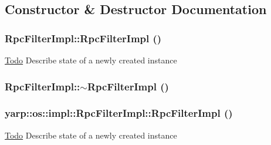 \subsection{Constructor \& Destructor Documentation}
\hypertarget{classyarp_1_1os_1_1impl_1_1_rpc_filter_impl_a15ed48bd9dfa1d97e242ea54b7d17977}{
\subsubsection[{RpcFilterImpl}]{\setlength{\rightskip}{0pt plus 5cm}RpcFilterImpl::RpcFilterImpl ()}}
\label{classyarp_1_1os_1_1impl_1_1_rpc_filter_impl_a15ed48bd9dfa1d97e242ea54b7d17977}
\begin{Desc}
\item[\hyperlink{todo__todo000001}{Todo}]Describe state of a newly created instance \end{Desc}
\hypertarget{classyarp_1_1os_1_1impl_1_1_rpc_filter_impl_af0b70bf356655fd2de7133532798faf0}{
\subsubsection[{$\sim$RpcFilterImpl}]{\setlength{\rightskip}{0pt plus 5cm}RpcFilterImpl::$\sim$RpcFilterImpl ()}}
\label{classyarp_1_1os_1_1impl_1_1_rpc_filter_impl_af0b70bf356655fd2de7133532798faf0}
\hypertarget{classyarp_1_1os_1_1impl_1_1_rpc_filter_impl_a542f5e2eed695cf4d8435d4426113c8b}{
\subsubsection[{RpcFilterImpl}]{\setlength{\rightskip}{0pt plus 5cm}yarp::os::impl::RpcFilterImpl::RpcFilterImpl ()}}
\label{classyarp_1_1os_1_1impl_1_1_rpc_filter_impl_a542f5e2eed695cf4d8435d4426113c8b}
\begin{Desc}
\item[\hyperlink{todo__todo000011}{Todo}]Describe state of a newly created instance \end{Desc}
